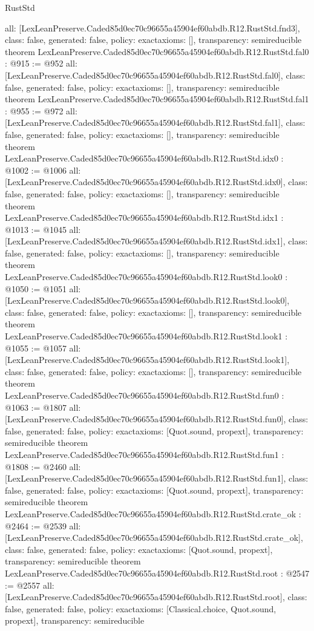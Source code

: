 \begin{lexlean}{RustStd}
\begin{coremodule}
{  all: [LexLeanPreserve.Caded85d0ec70c96655a45904ef60abdb.R12.RustStd.fnd3],
  class: false,
  generated: false,
  policy: exact{axioms: []},
  transparency: semireducible
}
theorem LexLeanPreserve.Caded85d0ec70c96655a45904ef60abdb.R12.RustStd.fal0 : @915 := @952 {
  all: [LexLeanPreserve.Caded85d0ec70c96655a45904ef60abdb.R12.RustStd.fal0],
  class: false,
  generated: false,
  policy: exact{axioms: []},
  transparency: semireducible
}
theorem LexLeanPreserve.Caded85d0ec70c96655a45904ef60abdb.R12.RustStd.fal1 : @955 := @972 {
  all: [LexLeanPreserve.Caded85d0ec70c96655a45904ef60abdb.R12.RustStd.fal1],
  class: false,
  generated: false,
  policy: exact{axioms: []},
  transparency: semireducible
}
theorem LexLeanPreserve.Caded85d0ec70c96655a45904ef60abdb.R12.RustStd.idx0 : @1002 := @1006 {
  all: [LexLeanPreserve.Caded85d0ec70c96655a45904ef60abdb.R12.RustStd.idx0],
  class: false,
  generated: false,
  policy: exact{axioms: []},
  transparency: semireducible
}
theorem LexLeanPreserve.Caded85d0ec70c96655a45904ef60abdb.R12.RustStd.idx1 : @1013 := @1045 {
  all: [LexLeanPreserve.Caded85d0ec70c96655a45904ef60abdb.R12.RustStd.idx1],
  class: false,
  generated: false,
  policy: exact{axioms: []},
  transparency: semireducible
}
theorem LexLeanPreserve.Caded85d0ec70c96655a45904ef60abdb.R12.RustStd.look0 : @1050 := @1051 {
  all: [LexLeanPreserve.Caded85d0ec70c96655a45904ef60abdb.R12.RustStd.look0],
  class: false,
  generated: false,
  policy: exact{axioms: []},
  transparency: semireducible
}
theorem LexLeanPreserve.Caded85d0ec70c96655a45904ef60abdb.R12.RustStd.look1 : @1055 := @1057 {
  all: [LexLeanPreserve.Caded85d0ec70c96655a45904ef60abdb.R12.RustStd.look1],
  class: false,
  generated: false,
  policy: exact{axioms: []},
  transparency: semireducible
}
theorem LexLeanPreserve.Caded85d0ec70c96655a45904ef60abdb.R12.RustStd.fun0 : @1063 := @1807 {
  all: [LexLeanPreserve.Caded85d0ec70c96655a45904ef60abdb.R12.RustStd.fun0],
  class: false,
  generated: false,
  policy: exact{axioms: [Quot.sound, propext]},
  transparency: semireducible
}
theorem LexLeanPreserve.Caded85d0ec70c96655a45904ef60abdb.R12.RustStd.fun1 : @1808 := @2460 {
  all: [LexLeanPreserve.Caded85d0ec70c96655a45904ef60abdb.R12.RustStd.fun1],
  class: false,
  generated: false,
  policy: exact{axioms: [Quot.sound, propext]},
  transparency: semireducible
}
theorem LexLeanPreserve.Caded85d0ec70c96655a45904ef60abdb.R12.RustStd.crate_ok : @2464 := @2539 {
  all: [LexLeanPreserve.Caded85d0ec70c96655a45904ef60abdb.R12.RustStd.crate_ok],
  class: false,
  generated: false,
  policy: exact{axioms: [Quot.sound, propext]},
  transparency: semireducible
}
theorem LexLeanPreserve.Caded85d0ec70c96655a45904ef60abdb.R12.RustStd.root : @2547 := @2557 {
  all: [LexLeanPreserve.Caded85d0ec70c96655a45904ef60abdb.R12.RustStd.root],
  class: false,
  generated: false,
  policy: exact{axioms: [Classical.choice, Quot.sound, propext]},
  transparency: semireducible
}


\end{coremodule}
\end{lexlean}

